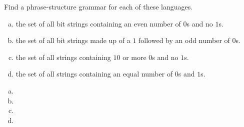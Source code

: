 \documentclass[../main.tex]{subfiles}
\begin{document}
Find a phrase-structure grammar for each of these languages.
\begin{enumerate}[a)]
	\item the set of all bit strings containing an even number of $0$s and no $1$s.
	\item the set of all bit strings made up of a $1$ followed by an odd number of $0$s.
	\setcounter{enumi}{3}
	\item the set of all strings containing $10$ or more $0$s and no $1$s.
	\setcounter{enumi}{5}
	\item the set of all strings containing an equal number of $0$s and $1$s.
\end{enumerate}

\solution
\begin{enumerate}[a)]
	\item  
	\item 
	\setcounter{enumi}{3}
	\item 
	\setcounter{enumi}{5}
	\item 
\end{enumerate}
\end{document}
